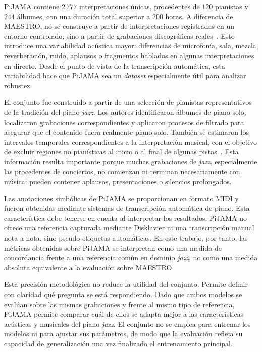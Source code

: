 \documentclass[11pt,spanish,listoffigures,listoftables]{tfgetsinf}
\begin{document}
PiJAMA contiene $2\,777$ interpretaciones únicas, procedentes de $120$ pianistas y
$244$ álbumes, con una duración total superior a 200 horas. A diferencia de MAESTRO,
no se construye a partir de interpretaciones registradas en un entorno controlado, sino
a partir de grabaciones discográficas reales~\cite{edwards2023pijama}. Esto introduce una variabilidad acústica
mayor: diferencias de microfonía, sala, mezcla, reverberación, ruido, aplausos o
fragmentos hablados en algunas interpretaciones en directo. Desde el punto de vista de
la transcripción automática, esta variabilidad hace que PiJAMA sea un \textit{dataset}
especialmente útil para analizar robustez.

El conjunto fue construido a partir de una selección de pianistas representativos de la
tradición del piano \textit{jazz}. Los autores identificaron álbumes de piano solo, localizaron
grabaciones correspondientes y aplicaron procesos de filtrado para asegurar que el
contenido fuera realmente piano solo. También se estimaron los intervalos temporales
correspondientes a la interpretación musical, con el objetivo de excluir regiones no
pianísticas al inicio o al final de algunas pistas~\cite{edwards2023pijama}. Esta información resulta importante
porque muchas grabaciones de \textit{jazz}, especialmente las procedentes de conciertos, no
comienzan ni terminan necesariamente con música: pueden contener aplausos,
presentaciones o silencios prolongados.

Las anotaciones simbólicas de PiJAMA se proporcionan en formato MIDI y fueron
obtenidas mediante sistemas de transcripción automática de piano. Esta característica
debe tenerse en cuenta al interpretar los resultados: PiJAMA no ofrece una referencia
capturada mediante Disklavier ni una transcripción manual nota a nota, sino
pseudo-etiquetas automáticas. En este trabajo, por tanto, las métricas obtenidas sobre
PiJAMA se interpretan como una medida de concordancia frente a una referencia común
en dominio \textit{jazz}, no como una medida absoluta equivalente a la evaluación sobre
MAESTRO.

Esta precisión metodológica no reduce la utilidad del conjunto. Permite
definir con claridad qué pregunta se está respondiendo. Dado que ambos modelos se
evalúan sobre las mismas grabaciones y frente al mismo tipo de referencia, PiJAMA
permite comparar cuál de ellos se adapta mejor a las características acústicas y musicales
del piano \textit{jazz}. El conjunto no se emplea para entrenar los modelos ni para ajustar sus
parámetros, de modo que la evaluación refleja su capacidad de generalización una vez
finalizado el entrenamiento principal.
\end{document}
